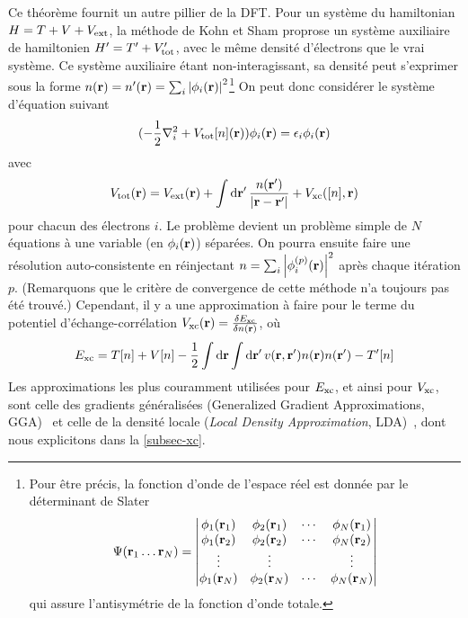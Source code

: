 Ce théorème fournit un autre pillier de la DFT\@.
Pour un système du hamiltonian $H = T + V + V_{\textnormal{ext}}$,
la méthode de Kohn et Sham proprose un système auxiliaire de hamiltonien $H' = T' + V'_{\textnormal{tot}}$,
avec le même densité d'électrons que le vrai système.
Ce système auxiliaire étant non-interagissant, sa densité peut s'exprimer sous la forme
$n(\vb{r}) = n'(\vb{r}) = \sum_i \abs{\phi_i(\vb{r})}^2$\footnote{Pour être précis,
  la fonction d'onde de l'espace réel est donnée par le déterminant de Slater
  \begin{equation*}
    \Psi(\vb{r}_1 \ldots \vb{r}_N) =
    \begin{vmatrix}
      \phi_1(\vb{r}_1) & \phi_2(\vb{r}_1) & \cdots & \phi_N(\vb{r}_1) \\
      \phi_1(\vb{r}_2) & \phi_2(\vb{r}_2) & \cdots & \phi_N(\vb{r}_2) \\
      \vdots           & \vdots           &        & \vdots           \\
      \phi_1(\vb{r}_N) & \phi_2(\vb{r}_N) & \cdots & \phi_N(\vb{r}_N) \\
    \end{vmatrix}
  \end{equation*}
  qui assure l'antisymétrie de la fonction d'onde totale.}
On peut donc considérer le système d'équation suivant
\begin{equation}
  \label{eqn-kseqns}
  (-\frac{1}{2}\laplacian_i + V_{\V{tot}}[n](\vb{r}))\phi_i(\vb{r}) = \epsilon_i\phi_i(\vb{r})
\end{equation}
avec
\begin{equation}
  \label{eqn-Vtot}
  V_{\textnormal{tot}}(\vb{r}) = V_{\textnormal{ext}}(\vb{r})
  + \int \dd{\vb{r}'} \frac{n(\vb{r}')}{\abs{\vb{r} - \vb{r}'}}
  + V_{\textnormal{xc}}([n], \vb{r})
\end{equation}
pour chacun des électrons $i$.
Le problème devient un problème simple de $N$ équations à une variable (en $\phi_i(\vb{r})$) séparées.
On pourra ensuite faire une résolution auto-consistente en réinjectant
$n = \sum_i \abs{\phi_i^{(p)}(\vb{r})}^2 $ après chaque itération $p$.
(Remarquons que le critère de convergence de cette méthode n'a toujours pas été trouvé.)
Cependant, il y a une approximation à faire pour le terme du potentiel d'échange-corrélation
$V_{\textnormal{xc}}(\vb{r}) = \frac{\delta E_{\textnormal{xc}}}{\delta n(\vb{r})}$, où
\begin{equation}
  \label{eqn-exc}
  E_{\textnormal{xc}} = T[n] + V[n] - \frac{1}{2}\int \dd{\vb{r}}
  \int \dd{\vb{r}'} v(\vb{r}, \vb{r}') n(\vb{r}) n(\vb{r'}) - T'[n]
\end{equation}
Les approximations les plus couramment utilisées pour $E_{\textnormal{xc}}$, et ainsi pour $V_{\textnormal{xc}}$,
sont celle des gradients généralisées (Generalized Gradient Approximations, GGA)~\cite{Langreth1980, Perdew1986, Perdew1992}
et celle de la densité locale (\textit{Local Density Approximation}, LDA)~\cite{Kohn1965},
dont nous explicitons dans la \cref{subsec-xc}.

